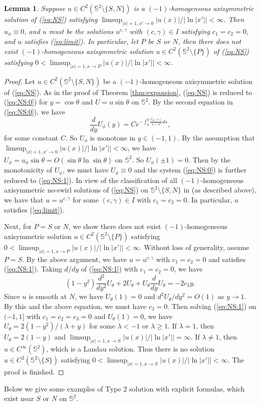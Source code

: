 \documentclass[12pt]{article}
\newtheorem{lem}{Lemma}[section]
\newcommand{\bS}{\mathbb{S}}
\begin{document}
\begin{lem}\label{lem:3_1}
	Suppose $u\in C^2(\mathbb{S}^2\setminus\{S, N\})$ is a $(-1)$-homogeneous axisymmetric solution of (\ref{eq:NS}) satisfying $\limsup_{|x|=1,x'\to 0}|u(x)|/| \ln |x'||<\infty$. Then $u_{\phi}\equiv 0$, and $u$ must be the solutions $u^{c, \gamma}$ with $(c, \gamma)\in I$ satisfying $c_1=c_2=0$, and $u$ satisfies (\ref{eq:limit}). 
	In particular, let $P$ be $S$ or $N$, then there does not exist $(-1)$-homogeneous axisymmetric solution $u\in C^2(\mathbb{S}^2\setminus\{P\})$ of (\ref{eq:NS}) satisfying $0<\limsup_{|x|=1,x\to P}|u(x)|/| \ln |x'||<\infty$. 
\end{lem}
\begin{proof}
	Let $u\in C^2(\mathbb{S}^2\setminus\{S, N\})$ be a $(-1)$-homogeneous axisymmetric solution of (\ref{eq:NS}). As in the proof of Theorem \ref{thm:expansion}, (\ref{eq:NS}) is reduced to (\ref{eq:NS:0}) for $y=\cos\theta$ and $U=u\sin\theta$ on $\bS^2$. By the second equation in (\ref{eq:NS:0}), we have 
	\begin{equation*}
		\frac{d}{dy}U_{\phi}(y)=Ce^{-\int_0^y\frac{U_{\theta}(s)}{1-s^2}ds},
	\end{equation*}
	for some constant $C$. So $U_{\phi}$ is monotone in $y\in (-1, 1)$. By the assumption that $\limsup_{|x|=1,x'\to 0}|u(x)|/| \ln |x'||<\infty$, we have $U_{\phi}=u_{\phi}\sin\theta=O(\sin\theta\ln \sin\theta)$ on $\bS^2$. So $U_{\phi}(\pm 1)=0$. Then by the monotonicity of $U_{\phi}$, we must have $U_{\phi}\equiv 0$ and the system (\ref{eq:NS:0}) is further reduced to (\ref{eq:NS:1}). In view of the classification of all $(-1)$-homogeneous axisymmetric no-swirl solutions of (\ref{eq:NS}) on $\bS^2\setminus\{S, N\}$ in \cite{LLY2} (as described above), we have that $u=u^{c, \gamma}$ for some $(c, \gamma)\in I$ with $c_1=c_2=0$. In particular, $u$ satisfies (\ref{eq:limit}). 
 
	Next, for $P=S$ or $N$, we show there does not exist $(-1)$-homogeneous axisymmetric solution $u\in C^2(\mathbb{S}^2\setminus\{P\})$ satisfying $0<\limsup_{|x|=1,x\to P}|u(x)|/| \ln |x'||<\infty$. Without loss of generality, assume $P=S$. By the above argument, we have $u=u^{c, \gamma}$ with $c_1=c_2=0$ and satisfies (\ref{eq:NS:1}). Taking $d/dy$ of (\ref{eq:NS:1}) with $c_1=c_2=0$, we have 
	\[
		(1-y^2)\frac{d^2}{dy^2}U_{\theta}+2U_{\theta}+U_{\theta}\frac{d}{dy}U_{\theta}=-2c_3y. 
	\]
	Since $u$ is smooth at $N$, we have $U_{\theta}(1)=0$ and $d^2U_{\theta}/dy^2=O(1)$ as $y\to 1$. By this and the above equation, we must have $c_3=0$. Then solving (\ref{eq:NS:1}) on $(-1, 1]$ with $c_1=c_2=c_3=0$ and $U_{\theta}(1)=0$, we have $U_{\theta}=2(1-y^2)/(\lambda+y)$ for some $\lambda<-1$ or $\lambda\ge 1$. If $\lambda=1$, then $U_{\theta}=2(1-y)$ and $\limsup_{|x|=1,x\to S}|u(x)|/| \ln |x'||=\infty$. If $\lambda\ne 1$, then $u\in C^{\infty}(\mathbb{S}^2)$, which is a Landau solution. Thus there is no solution $u\in C^2(\mathbb{S}^2\setminus\{S\})$ satisfying $0<\limsup_{|x|=1,x\to S}|u(x)|/| \ln |x'||<\infty$. The proof is finished. 
\end{proof}
Below we give some examples of Type 2 solution with explicit formulas, which exist near $S$ or $N$ on $\mathbb{S}^2$. 
\end{document}
